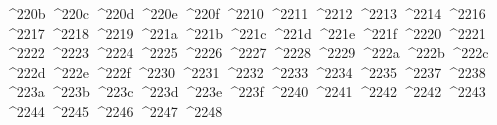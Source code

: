 {  ^^^^220b%
  ^^^^220c%
  ^^^^220d%
  ^^^^220e%
  ^^^^220f%
  ^^^^2210%
  ^^^^2211%
  ^^^^2212%
  ^^^^2213%
  ^^^^2214%
  ^^^^2216%
  ^^^^2217%
  ^^^^2218%
  ^^^^2219%
  ^^^^221a%
  ^^^^221b%
  ^^^^221c%
  ^^^^221d%
  ^^^^221e%
  ^^^^221f%
  ^^^^2220%
  ^^^^2221%
  ^^^^2222%
  ^^^^2223%
  ^^^^2224%
  ^^^^2225%
  ^^^^2226%
  ^^^^2227%
  ^^^^2228%
  ^^^^2229%
  ^^^^222a%
  ^^^^222b%
  ^^^^222c%
  ^^^^222d%
  ^^^^222e%
  ^^^^222f%
  ^^^^2230%
  ^^^^2231%
  ^^^^2232%
  ^^^^2233%
  ^^^^2234%
  ^^^^2235%
  ^^^^2237%
  ^^^^2238%
  ^^^^223a%
  ^^^^223b%
  ^^^^223c%
  ^^^^223d%
  ^^^^223e%
  ^^^^223f%
  ^^^^2240%
  ^^^^2241%
  ^^^^2242%
  ^^^^2242%
  ^^^^2243%
  ^^^^2244%
  ^^^^2245%
  ^^^^2246%
  ^^^^2247%
  ^^^^2248%
}
